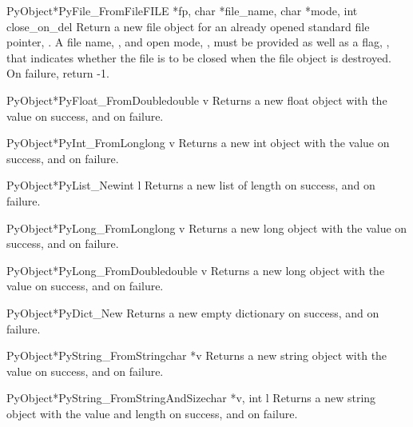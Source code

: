 \documentclass[twoside,openright]{report}
\begin{document}
\begin{cfuncdesc}{PyObject*}{PyFile_FromFile}{FILE *fp, char *file_name, char *mode, int close_on_del}
Return a new file object for an already opened standard \C{}
file pointer, .  A file name, , and open mode,
, must be provided as well as a flag, , that
indicates whether the file is to be closed when the file
object is destroyed.  On failure, return -1.
\end{cfuncdesc}

\begin{cfuncdesc}{PyObject*}{PyFloat_FromDouble}{double v}
Returns a new float object with the value  on success, and
\NULL{} on failure.
\end{cfuncdesc}

\begin{cfuncdesc}{PyObject*}{PyInt_FromLong}{long v}
Returns a new int object with the value  on success, and
\NULL{} on failure.
\end{cfuncdesc}

\begin{cfuncdesc}{PyObject*}{PyList_New}{int l}
Returns a new list of length  on success, and \NULL{} on
failure.
\end{cfuncdesc}

\begin{cfuncdesc}{PyObject*}{PyLong_FromLong}{long v}
Returns a new long object with the value  on success, and
\NULL{} on failure.
\end{cfuncdesc}

\begin{cfuncdesc}{PyObject*}{PyLong_FromDouble}{double v}
Returns a new long object with the value  on success, and
\NULL{} on failure.
\end{cfuncdesc}

\begin{cfuncdesc}{PyObject*}{PyDict_New}{}
Returns a new empty dictionary on success, and \NULL{} on
failure.
\end{cfuncdesc}

\begin{cfuncdesc}{PyObject*}{PyString_FromString}{char *v}
Returns a new string object with the value  on success, and
\NULL{} on failure.
\end{cfuncdesc}

\begin{cfuncdesc}{PyObject*}{PyString_FromStringAndSize}{char *v, int l}
Returns a new string object with the value  and length 
on success, and \NULL{} on failure.
\end{cfuncdesc}
\end{document}
